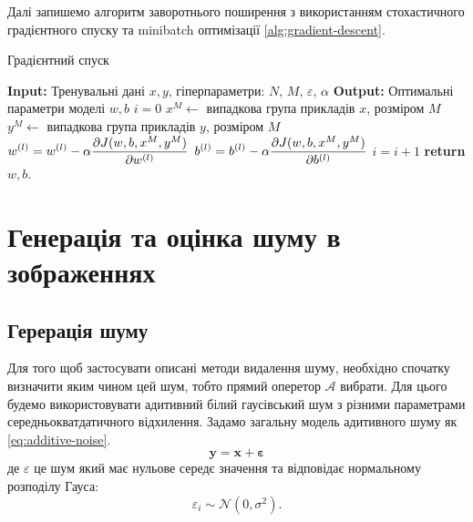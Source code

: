 \documentclass[14pt,a4paper]{extarticle}
\renewcommand{\algorithmicrequire}{\textbf{Input: }}
\renewcommand{\algorithmicensure}{\textbf{Output: }}
\newcommand{\algorithmreturn}{\textbf{return }}
\newcounter{e}
\numberwithin{equation}{section}
\numberwithin{figure}{section}
\begin{document}
	Далі запишемо алгоритм заворотнього поширення з використанням стохастичного градієнтного спуску та minibatch оптимізації \ref{alg:gradient-descent}.
	\begin{algorithm}[H]
		\caption{Градієнтний спуск}
		\label{alg:gradient-descent}
		\begin{algorithmic}[1]
			\State \algorithmicrequire{Тренувальні дані $x, y$, гіперпараметри: $N$, $M$, $\varepsilon$, $\alpha$}
			\State \algorithmicensure{ Оптимальні параметри моделі $w, b$}
			\State $i = 0$
			\State $x^M \leftarrow$ випадкова група прикладів $x$, розміром $M$
			\State $y^M \leftarrow$ випадкова група прикладів $y$, розміром $M$
			\State $\displaystyle w^{(l)} = w^{(l)} -  \alpha \pdv{J(w, b, x^M, y^M)}{w^{(l)}}$
			\vspace{0.2cm}
			\State $\displaystyle b^{(l)} = b^{(l)} - \alpha \pdv{J(w, b, x^M, y^M)}{b^{(l)}}$
			\State $\displaystyle i = i + 1$
			\EndFor
			\EndWhile
			\State \algorithmreturn{$w, b$}.
		\end{algorithmic}
	\end{algorithm}

	\newpage
	\thispagestyle{empty}
	\section{Генерація та оцінка шуму в зображеннях}

	\subsection{Герерація шуму}	
	Для того щоб застосувати описані методи видалення шуму, необхідно спочатку визначити яким чином цей шум, тобто прямий оперетор $\mathcal{A}$ вибрати. Для цього будемо використовувати адитивний білий гаусівський шум з різними параметрами середньокватдатичного відхилення. Задамо загальну модель адитивного шуму як \ref{eq:additive-noise}.
	\begin{equation}
		\label{eq:additive-noise}
		\mathbf{y}=\mathbf{x} + \mathbf{\varepsilon}
	\end{equation}
	де $\varepsilon$ це шум який має нульове середє значення та відповідає нормальному розподілу Гауса:
	\begin{equation}
		\varepsilon_{i} \sim \mathcal{N}\left(0, \sigma^{2}\right) .
	\end{equation}
	
\end{document}

